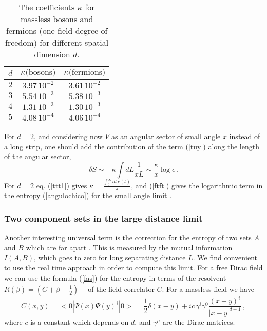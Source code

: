 \documentclass[a4paper]{article}
\begin{document}
 \begin{table}[t]
\centering
\begin{tabular}{|c|cc|} \hline 
$d$ & $\kappa \textrm{(bosons)}$ & $\kappa \textrm{(fermions)}$ \\  \hline
$2$ & $3.97 \,10^{-2}$& $3.61 \,10^{-2}$ \\  
$3$ & $5.54 \,10^{-3}$ & $5.38 \,10^{-3}$\\ 
$4$ & $1.31 \,10^{-3}$ & $1.30 \,10^{-3}$\\ 
$5$ & $4.08 \,10^{-4}$ & $4.06 \,10^{-4}$\\ \hline
\end{tabular} 
\label{tatal}
\caption{The coefficients $\kappa$ for massless bosons and fermions (one field degree of freedom) for different spatial dimension $d$.}
\end{table}
 
For $d=2$, and considering now $V$ as an angular sector of small angle $x$ instead of a long strip, one should add the contribution of the term (\ref{tuy}) along the length of the angular sector,
 \begin{equation}
\delta S\sim -\kappa \int dL \frac{1}{x L}\sim \frac{\kappa}{x}\log \epsilon\,.\label{ftft}
\end{equation}
 For $d=2$ eq. (\ref{ttt1}) gives $\kappa=\frac{\int_0^\infty dt \,c(t)}{\pi}$, and (\ref{ftft}) gives the logarithmic term in the entropy (\ref{angulochico}) for the small angle limit \cite{log}.  
 
\subsubsection{Two component sets in the large distance limit}
Another interesting universal term is the correction for the entropy of two sets $A$ and $B$ which are far apart \cite{remarks}. This is measured by the mutual information $I(A,B)$, which goes to zero for long separating distance $L$. 
 We find convenient to use the real time approach in order to compute this limit.  
For a free Dirac field we can use the formula (\ref{fas}) for the entropy  
in terms of the resolvent $R(\beta)=\left( C+\beta-\frac{1}{2}\right)^{-1}$ of the field correlator $C$. 
For a massless field we have 
\begin{equation}
C(x,y)=<0|\Psi(x)\Psi(y)^\dagger|0>= \frac{1}{2} \delta(x-y)+i c\, \gamma^i \gamma^0 \frac{(x-y)^i}{|x-y|^{d+1}}\,,
\end{equation}
where $c$ is a constant which depends on $d$, and $\gamma^\mu$ are the Dirac matrices.
\end{document}
